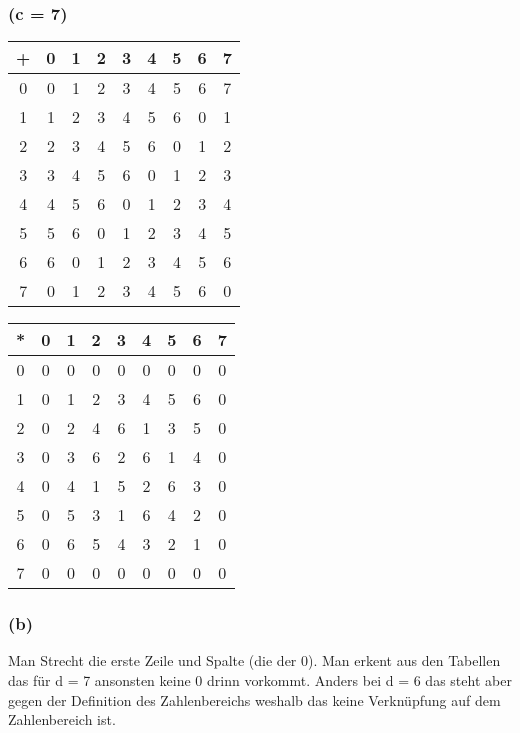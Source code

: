 \documentclass{article}
\begin{document}
\subsubsection*{(c = 7)}
\begin{center}
    \begin{tabular}{c|cccccccc}
        + & 0 & 1 & 2 & 3 & 4 & 5 & 6 & 7\\
        \hline
        0 & 0 & 1 & 2 & 3 & 4 & 5 & 6 & 7\\
        1 & 1 & 2 & 3 & 4 & 5 & 6 & 0 & 1\\
        2 & 2 & 3 & 4 & 5 & 6 & 0 & 1 & 2\\
        3 & 3 & 4 & 5 & 6 & 0 & 1 & 2 & 3\\
        4 & 4 & 5 & 6 & 0 & 1 & 2 & 3 & 4\\
        5 & 5 & 6 & 0 & 1 & 2 & 3 & 4 & 5\\
        6 & 6 & 0 & 1 & 2 & 3 & 4 & 5 & 6\\
        7 & 0 & 1 & 2 & 3 & 4 & 5 & 6 & 0\\
    \end{tabular}
\end{center}
    
\begin{center}
    \begin{tabular}{c|cccccccc}
        * & 0 & 1 & 2 & 3 & 4 & 5 & 6 & 7\\
        \hline
        0 & 0 & 0 & 0 & 0 & 0 & 0 & 0 & 0\\
        1 & 0 & 1 & 2 & 3 & 4 & 5 & 6 & 0\\
        2 & 0 & 2 & 4 & 6 & 1 & 3 & 5 & 0\\
        3 & 0 & 3 & 6 & 2 & 6 & 1 & 4 & 0\\
        4 & 0 & 4 & 1 & 5 & 2 & 6 & 3 & 0\\
        5 & 0 & 5 & 3 & 1 & 6 & 4 & 2 & 0\\
        6 & 0 & 6 & 5 & 4 & 3 & 2 & 1 & 0\\
        7 & 0 & 0 & 0 & 0 & 0 & 0 & 0 & 0\\
    \end{tabular}
        
\end{center}
\subsubsection*{(b)}
Man Strecht die erste Zeile und Spalte (die der 0). Man erkent aus den Tabellen das für d = 7 ansonsten keine 0 drinn vorkommt. Anders bei d = 6 das steht aber gegen der Definition des Zahlenbereichs weshalb das keine Verknüpfung auf dem Zahlenbereich ist.
\end{document}
